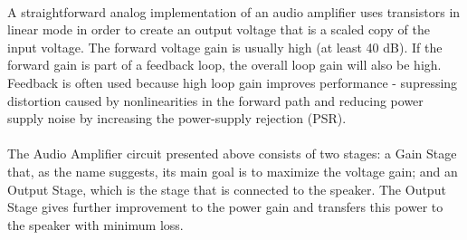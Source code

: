 \paragraph{} 
A straightforward analog implementation of an audio amplifier uses transistors in linear mode in order to create an output voltage that is a scaled copy of the input voltage. The forward voltage gain is usually high (at least 40 dB). If the forward gain is part of a feedback loop, the overall loop gain will also be high. Feedback is often used because high loop gain improves performance - supressing distortion caused by nonlinearities in the forward path and reducing power supply noise by increasing the power-supply rejection (PSR).

\paragraph{}
The Audio Amplifier circuit presented above consists of two stages: a Gain Stage that, as the name suggests, its main goal is to maximize the voltage gain; and an Output Stage, which is the stage that is connected to the speaker. The Output Stage gives further improvement to the power gain and transfers this power to the speaker with minimum loss.
